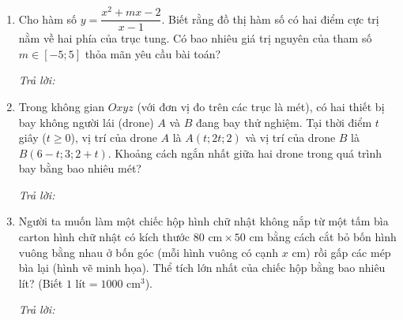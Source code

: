 \documentclass[12pt,a4paper]{article}
\newcommand{\otraloi}{\par\nobreak\smallskip\noindent\textit{Trả lời:}\quad\fbox{\rule{0pt}{11pt}\makebox[0.3cm]{}}\,\fbox{\rule{0pt}{11pt}\makebox[0.3cm]{}}\,\fbox{\rule{0pt}{11pt}\makebox[0.3cm]{}}\,\fbox{\rule{0pt}{11pt}\makebox[0.3cm]{}}}
\begin{document}
\newpage
\begin{enumerate}[start=3]
\item Cho hàm số $y=\dfrac{x^2+mx-2}{x-1}$. Biết rằng đồ thị hàm số có hai điểm cực trị nằm về hai phía của trục tung. Có bao nhiêu giá trị nguyên của tham số $m\in[-5;5]$ thỏa mãn yêu cầu bài toán?
\otraloi

\item Trong không gian $Oxyz$ (với đơn vị đo trên các trục là mét), có hai thiết bị bay không người lái (drone) $A$ và $B$ đang bay thử nghiệm. Tại thời điểm $t$ giây ($t\ge 0$), vị trí của drone $A$ là $A(t;2t;2)$ và vị trí của drone $B$ là $B(6-t;3;2+t)$. Khoảng cách ngắn nhất giữa hai drone trong quá trình bay bằng bao nhiêu mét?
\otraloi

\item Người ta muốn làm một chiếc hộp hình chữ nhật không nắp từ một tấm bìa carton hình chữ nhật có kích thước $80\text{ cm}\times 50\text{ cm}$ bằng cách cắt bỏ bốn hình vuông bằng nhau ở bốn góc (mỗi hình vuông có cạnh $x\text{ cm}$) rồi gấp các mép bìa lại (hình vẽ minh họa). Thể tích lớn nhất của chiếc hộp bằng bao nhiêu lít? (Biết $1\text{ lít}=1000\text{ cm}^3$).
\begin{center}
\par{}
\end{center}
\otraloi


\end{enumerate}
\end{document}
